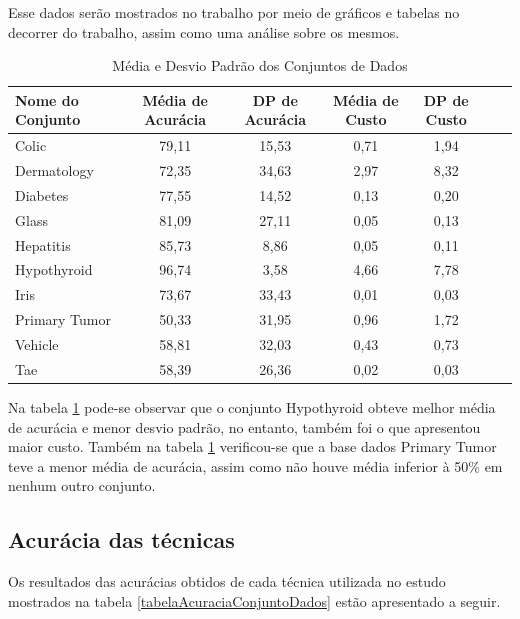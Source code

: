 \documentclass[12pt]{article}
\begin{document}
Esse dados serão mostrados no trabalho por  meio de gráficos e tabelas no decorrer do trabalho, assim como uma análise sobre os mesmos.


\begin{table}[h]

	\centering
	\caption{Média e Desvio Padrão dos Conjuntos de Dados}
	\label{tabelaMediaDP}
	\begin{tabular}{lcccccc}
		\hline
		Nome do Conjunto & Média de Acurácia & DP de Acurácia & Média de Custo & DP de Custo \\ \hline
		Colic  & 79,11 & 15,53 & 0,71 & 1,94 \\ \hline
		Dermatology  & 72,35 & 34,63 & 2,97 & 8,32  \\ \hline
		Diabetes  & 77,55 & 14,52 & 0,13 & 0,20 \\ \hline
		Glass  & 81,09 & 27,11 & 0,05 & 0,13 \\ \hline
		Hepatitis  & 85,73 & 8,86 & 0,05 & 0,11 \\ \hline
		Hypothyroid  & 96,74 & 3,58 & 4,66 & 7,78 \\ \hline
		Iris  & 73,67 & 33,43 & 0,01 & 0,03 \\ \hline
		Primary Tumor  & 50,33 & 31,95 & 0,96 & 1,72 \\ \hline
		Vehicle  & 58,81 & 32,03 & 0,43 & 0,73 \\ \hline
		Tae  & 58,39 & 26,36 & 0,02 & 0,03 \\ \hline
	\end{tabular}
\end{table}

Na tabela \ref{tabelaMediaDP} pode-se observar que o conjunto Hypothyroid obteve melhor média de acurácia e menor desvio padrão, no entanto, também foi o que apresentou maior custo. Também na tabela \ref{tabelaMediaDP} verificou-se que a base dados Primary Tumor teve a menor média de acurácia, assim como não houve média inferior à 50\% em nenhum outro conjunto.

\subsection{Acurácia das técnicas} \label{sec:acuracia}

Os resultados das acurácias obtidos de cada técnica utilizada no estudo mostrados na tabela \ref{tabelaAcuraciaConjuntoDados} estão apresentado a seguir.
\end{document}
